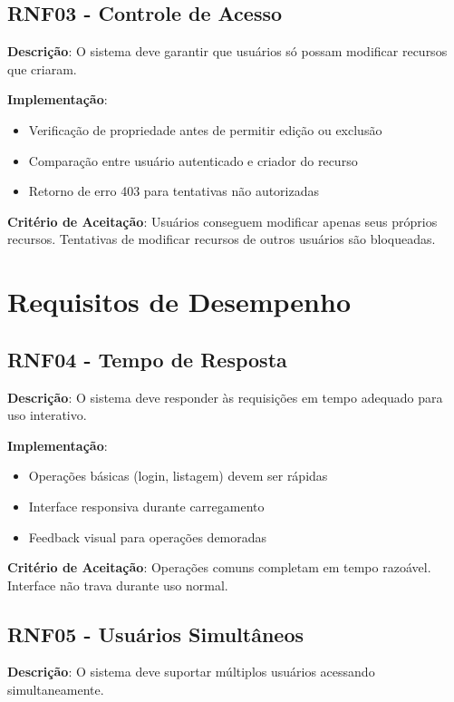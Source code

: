 \documentclass[12pt,a4paper]{article}
\begin{document}
\subsection{RNF03 - Controle de Acesso}

\textbf{Descrição}: O sistema deve garantir que usuários só possam modificar recursos que criaram.

\textbf{Implementação}:
\begin{itemize}
    \item Verificação de propriedade antes de permitir edição ou exclusão
    \item Comparação entre usuário autenticado e criador do recurso
    \item Retorno de erro 403 para tentativas não autorizadas
\end{itemize}

\textbf{Critério de Aceitação}: Usuários conseguem modificar apenas seus próprios recursos. Tentativas de modificar recursos de outros usuários são bloqueadas.

\section{Requisitos de Desempenho}

\subsection{RNF04 - Tempo de Resposta}

\textbf{Descrição}: O sistema deve responder às requisições em tempo adequado para uso interativo.

\textbf{Implementação}:
\begin{itemize}
    \item Operações básicas (login, listagem) devem ser rápidas
    \item Interface responsiva durante carregamento
    \item Feedback visual para operações demoradas
\end{itemize}

\textbf{Critério de Aceitação}: Operações comuns completam em tempo razoável. Interface não trava durante uso normal.

\subsection{RNF05 - Usuários Simultâneos}

\textbf{Descrição}: O sistema deve suportar múltiplos usuários acessando simultaneamente.
\end{document}
